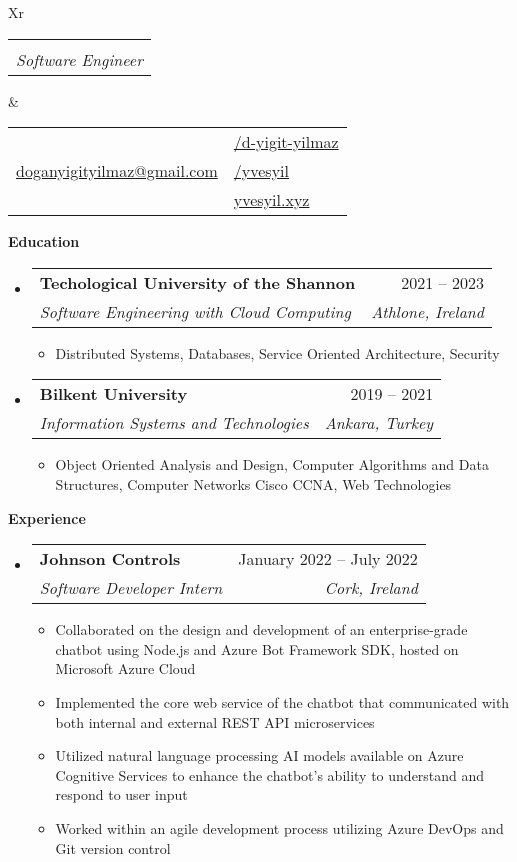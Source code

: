 \documentclass[letterpaper,12pt]{article}[leftmargin=*]
\makeatletter
\def \fullname {Yiğit Yılmaz}
\def \subtitle {Software Engineer}
\def \linkedinicon {\faLinkedin}
\def \linkedinlink {https://linkedin.com/in/d-yigit-yilmaz/}
\def \linkedintext {/d-yigit-yilmaz}
\def \phoneicon {\faPhone}
\def \phonetext {+353 85 817 1075}
\def \emailicon {\faEnvelope}
\def \emaillink {mailto:doganyigityilmaz@gmail.com}
\def \emailtext {doganyigityilmaz@gmail.com}
\def \githubicon {\faGithub}
\def \githublink {https://github.com/yvesyil}
\def \githubtext {/yvesyil}
\def \websiteicon {\faGlobe}
\def \websitelink {https://yvesyil.xyz}
\def \websitetext {yvesyil.xyz}
\def \headertype {\doublecol} %
\def \entryspacing {-0pt}
\def \linkedin {\linkedinicon \hspace{3pt}\href{\linkedinlink}{\linkedintext}}
\def \phone {\phoneicon \hspace{3pt}{ \phonetext}}
\def \email {\emailicon \hspace{3pt}\href{\emaillink}{\emailtext}}
\def \github {\githubicon \hspace{3pt}\href{\githublink}{\githubtext}}
\def \website {\websiteicon \hspace{3pt}\href{\websitelink}{\websitetext}}
\renewcommand{\section}[2]{\vspace{5pt}
  \colorbox{secondary}{\color{white}\raggedbottom\normalsize\textbf{{#1}{\hspace{7pt}#2}}}
}
\newcommand{\resumeEntryStart}{\begin{itemize}[leftmargin=2.5mm]}
\newcommand{\resumeEntryEnd}{\end{itemize}\vspace{\entryspacing}}
\newcommand{\resumeItemListStart}{\begin{itemize}[leftmargin=4.5mm]}
\newcommand{\resumeItemListEnd}{\end{itemize}}
\newcommand{\resumeItem}[1]{
  \item\small{
    {#1 \vspace{-2pt}}
  }
}
\newcommand{\resumeEntryTSDL}[4]{
  \vspace{-1pt}\item[]
    \begin{tabularx}{0.97\textwidth}{X@{\hspace{60pt}}r}
      \textbf{\color{primary}#1} & {\firabook\color{accent}\small#2} \\
      \textit{\color{accent}\small#3} & \textit{\color{accent}\small#4} \\
    \end{tabularx}\vspace{-6pt}
}
\newcommand{\doublecol}[6]{
  \begin{tabularx}{\textwidth}{Xr}
    {
      \begin{tabular}[c]{l}
        \fontsize{25}{35}\selectfont{\color{primary}{{\textbf{\fullname}}}} \\
        {\textit{\subtitle}} %
      \end{tabular}
    } & {
      \begin{tabular}[c]{l@{\hspace{1.5em}}l}
        {\small#4} & {\small#1} \\
        {\small#5} & {\small#2} \\
        {\small#6} & {\small#3}
      \end{tabular}
    }
  \end{tabularx}
}
\newcommand{\singlecol}[6]{
  \begin{tabularx}{\textwidth}{Xr}
    {
      \begin{tabular}[b]{l}
        \fontsize{35}{45}\selectfont{\color{primary}{{\textbf{\fullname}}}} \\
        {\textit{\subtitle}} %
      \end{tabular}
    } & {
      \begin{tabular}[c]{l}
        {\small#1} \\
        {\small#2} \\
        {\small#3} \\
        {\small#4} \\
        {\small#5} \\
        {\small#6}
      \end{tabular}
    }
  \end{tabularx}
}
\makeatother
\begin{document}


\headertype{\linkedin}{\github}{\website}{\phone}{\email}{} %
\vspace{-5pt} %

\section{\faGraduationCap}{Education}

  \resumeEntryStart
    \resumeEntryTSDL
      {Techological University of the Shannon}{2021 -- 2023}
      {Software Engineering with Cloud Computing}{Athlone, Ireland}
    \resumeItemListStart
      \resumeItem {Distributed Systems, Databases, Service Oriented Architecture, Security}
    \resumeItemListEnd
    \resumeEntryTSDL
      {Bilkent University}{2019 -- 2021}
      {Information Systems and Technologies}{Ankara, Turkey}
    \resumeItemListStart
      \resumeItem {Object Oriented Analysis and Design, Computer Algorithms and Data Structures, Computer Networks Cisco CCNA, Web Technologies}
    \resumeItemListEnd
  \resumeEntryEnd

\section{\faPieChart}{Experience}

  \resumeEntryStart
    \resumeEntryTSDL
      {Johnson Controls}{January 2022 -- July 2022}
      {Software Developer Intern}{Cork, Ireland}
    \resumeItemListStart
      \resumeItem {Collaborated on the design and development of an enterprise-grade chatbot using Node.js and Azure Bot Framework SDK, hosted on Microsoft Azure Cloud}
      \resumeItem {Implemented the core web service of the chatbot that communicated with both internal and external REST API microservices}
      \resumeItem {Utilized natural language processing AI models available on Azure Cognitive Services to enhance the chatbot's ability to understand and respond to user input}
      \resumeItem {Worked within an agile development process utilizing Azure DevOps and Git version control}
    \resumeItemListEnd
  \resumeEntryEnd
\end{document}
